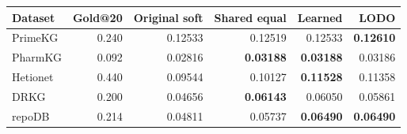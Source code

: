 \begin{tabular}{lrrrrr}
\toprule
Dataset & Gold@20 & Original soft & Shared equal & Learned & LODO \\
\midrule
PrimeKG & 0.240 & 0.12533 & 0.12519 & 0.12533 & \textbf{0.12610} \\
PharmKG & 0.092 & 0.02816 & \textbf{0.03188} & \textbf{0.03188} & 0.03186 \\
Hetionet & 0.440 & 0.09544 & 0.10127 & \textbf{0.11528} & 0.11358 \\
DRKG & 0.200 & 0.04656 & \textbf{0.06143} & 0.06050 & 0.05861 \\
repoDB & 0.214 & 0.04811 & 0.05737 & \textbf{0.06490} & \textbf{0.06490} \\
\bottomrule
\end{tabular}
